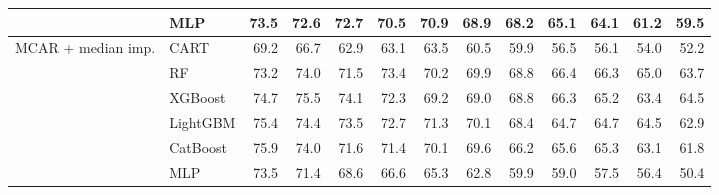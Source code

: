 \begin{table}[p]
\begin{tabular}{@{}llrrrrrrrrrrr@{}}
 & MLP & 73.5 & 72.6 & 72.7 & 70.5 & 70.9 & 68.9 & 68.2 & 65.1 & 64.1 & 61.2 & 59.5 \\
\midrule
MCAR + median imp. & CART & 69.2 & 66.7 & 62.9 & 63.1 & 63.5 & 60.5 & 59.9 & 56.5 & 56.1 & 54.0 & 52.2 \\
 & RF & 73.2 & 74.0 & 71.5 & 73.4 & 70.2 & 69.9 & 68.8 & 66.4 & 66.3 & 65.0 & 63.7 \\
 & XGBoost & 74.7 & 75.5 & 74.1 & 72.3 & 69.2 & 69.0 & 68.8 & 66.3 & 65.2 & 63.4 & 64.5 \\
 & LightGBM & 75.4 & 74.4 & 73.5 & 72.7 & 71.3 & 70.1 & 68.4 & 64.7 & 64.7 & 64.5 & 62.9 \\
 & CatBoost & 75.9 & 74.0 & 71.6 & 71.4 & 70.1 & 69.6 & 66.2 & 65.6 & 65.3 & 63.1 & 61.8 \\
 & MLP & 73.5 & 71.4 & 68.6 & 66.6 & 65.3 & 62.8 & 59.9 & 59.0 & 57.5 & 56.4 & 50.4 \\
\bottomrule
\end{tabular}
\end{table}

